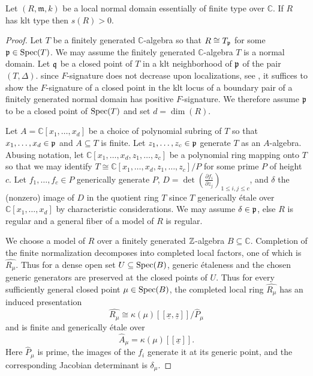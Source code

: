\documentclass[12pt]{amsart}
\numberwithin{equation}{theorem}
\theoremstyle{plain}
\newcommand{\fm}{\mathfrak{m}}
\newcommand{\CC}{\mathbb{C}}
\begin{document}
\begin{corollary}
    \label{cor: positive lim F-signature}
    Let $(R,\fm,k)$ be a local normal domain essentially of finite type over $\CC$. If $R$ has klt type then $s(R) >0.$
\end{corollary}

\begin{proof}
    Let $T$ be a finitely generated $\CC$-algebra so that $R\cong T_{\mathfrak{p}}$ for some $\mathfrak{p}\in \operatorname{{Spec}}(T)$. We may assume the finitely generated $\CC$-algebra $T$ is a normal domain. Let $\mathfrak{q}$ be a closed point of $T$ in a klt neighborhood of $\mathfrak{p}$ of the pair $(T,\Delta)$. since $F$-signature does not decrease upon localizations, see \cite{Polstra2018,PolstraTucker2018}, it suffices to show the $F$-signature of a closed point in the klt locus of a boundary pair of a finitely generated normal domain has positive $F$-signature. We therefore assume $\mathfrak{p}$ to be a closed point of $\operatorname{{Spec}}(T)$ and set $d = \dim(R)$.
    
     Let $A = \mathbb{C}[x_1,\ldots,x_d]$ be a choice of polynomial subring of $T$ so that $x_1,\ldots,x_d\in \mathfrak{p}$ and $A\subseteq T$ is finite. Let $z_1,\ldots,z_c\in \mathfrak{p}$ generate $T$ as an $A$-algebra. Abusing notation, let $\CC[x_1,\ldots,x_d,z_1,\ldots,z_c]$ be a polynomial ring mapping onto $T$ so that we may identify $T\cong \CC[x_1,\ldots,x_d,z_1,\ldots,z_c]/P$ for some prime $P$ of height $c$. Let $f_1,\ldots,f_c\in P$ generically generate $P$, $D = \det(\frac{\partial f_i}{\partial z_j})_{1\leq i,j \leq c}$, and $\delta$ the (nonzero) image of $D$ in the quotient ring $T$ since $T$ generically \'{e}tale over $\CC[x_1,\ldots,x_d]$ by characteristic considerations. We may assume $\delta\in \mathfrak{p}$, else $R$ is regular and a general fiber of a model of $R$ is regular.

    
    We choose a model of $R$ over a finitely generated $\mbox{$\mathbb{Z}$}$-algebra $B\subseteq \CC$. Completion of the finite normalization decomposes into completed local factors, one of which is $\widehat{R_\mu}$. Thus for a dense open set $U\subseteq \operatorname{{Spec}}(B)$, generic \'{e}taleness and the chosen generic generators are preserved at the closed points of $U$. Thus for every sufficiently general closed point $\mu\in \operatorname{{Spec}}(B)$, the completed local ring $\widehat{R_\mu}$ has an induced presentation
    \[
    \widehat{R_\mu} \cong \kappa(\mu)[[\underline{x},\underline{z}]]/\widehat P_\mu
    \]
    and is finite and generically \'{e}tale over
    \[
    \widehat A_\mu= \kappa(\mu)[[\underline{x}]].
    \]
    Here $\widehat P_\mu$ is prime, the images of the $f_i$ generate it at its generic point, and the corresponding Jacobian determinant is $\delta_\mu$.



\end{proof}
\end{document}
